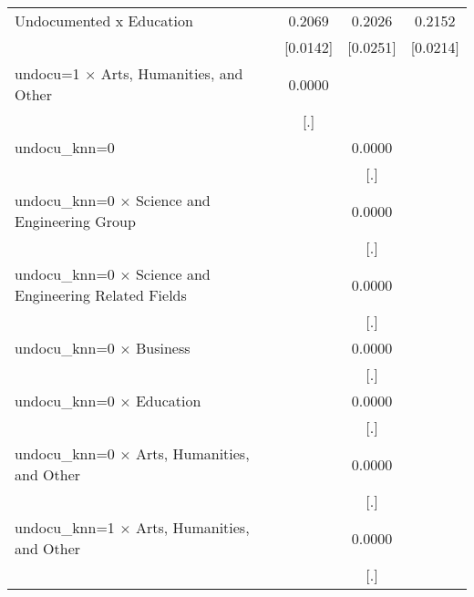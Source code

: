 \begin{table}[htbp]
\begin{tabular}{l*{3}{c}}
\addlinespace
Undocumented x Education&      0.2069\sym{***}&      0.2026\sym{***}&      0.2152\sym{***}\\
                    &    [0.0142]         &    [0.0251]         &    [0.0214]         \\
\addlinespace
undocu=1 $\times$ Arts, Humanities, and Other&      0.0000         &                     &                     \\
                    &         [.]         &                     &                     \\
\addlinespace
undocu\_knn=0        &                     &      0.0000         &                     \\
                    &                     &         [.]         &                     \\
\addlinespace
undocu\_knn=0 $\times$ Science and Engineering Group&                     &      0.0000         &                     \\
                    &                     &         [.]         &                     \\
\addlinespace
undocu\_knn=0 $\times$ Science and Engineering Related Fields&                     &      0.0000         &                     \\
                    &                     &         [.]         &                     \\
\addlinespace
undocu\_knn=0 $\times$ Business&                     &      0.0000         &                     \\
                    &                     &         [.]         &                     \\
\addlinespace
undocu\_knn=0 $\times$ Education&                     &      0.0000         &                     \\
                    &                     &         [.]         &                     \\
\addlinespace
undocu\_knn=0 $\times$ Arts, Humanities, and Other&                     &      0.0000         &                     \\
                    &                     &         [.]         &                     \\
\addlinespace
undocu\_knn=1 $\times$ Arts, Humanities, and Other&                     &      0.0000         &                     \\
                    &                     &         [.]         &                     \\

\end{tabular}
\end{table}
